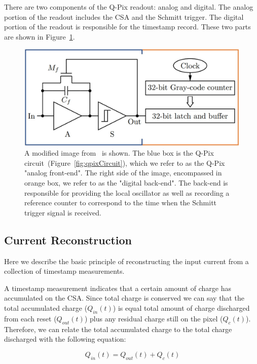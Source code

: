 There are two components of the Q-Pix readout: analog and digital.
The analog portion of the readout includes the CSA and the Schmitt trigger.
The digital portion of the readout is responsible for the timestamp record.
These two parts are shown in Figure~\ref{fig:qpix_frontandbackend}.

\begin{figure}[]
\centering
\includegraphics[width=\textwidth]{images/qpix_circuit_frontandbackend.jpg}
\caption{A modified image from~\citep{qpix:nygren:mei} is shown.
The blue box is the Q-Pix circuit~(Figure~\ref{fig:qpixCircuit}), which we refer to as the Q-Pix "analog front-end".
The right side of the image, encompassed in orange box, we refer to as the "digital back-end".
The back-end is responsible for providing the local oscillator as well as recording a reference counter to correspond to the time when the Schmitt trigger signal is received.
}
\label{fig:qpix_frontandbackend}
\end{figure}

\subsection{Current Reconstruction}
\label{sec:rtds_and_waveforms}
Here we describe the basic principle of reconstructing the input current from a collection of timestamp measurements.

A timestamp measurement indicates that a certain amount of charge has accumulated on the CSA.
Since total charge is conserved we can say that the total accumulated charge ($Q_{in}(t)$) is equal total amount of charge discharged from each reset ($Q_{out}(t)$) plus any residual charge still on the pixel ($Q_{c}(t)$).
Therefore, we can relate the total accumulated charge to the total charge discharged with the following equation:

\begin{equation}~\label{eq:qin}
Q_{in}(t) = Q_{out}(t) + Q_{c}(t)
\end{equation}

